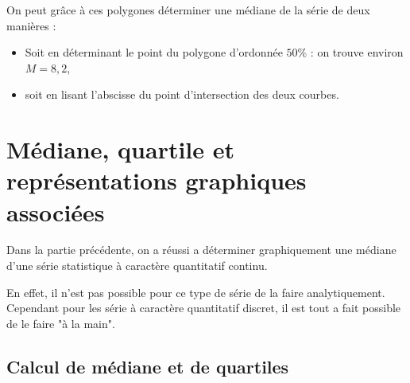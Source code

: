 \begin{ex}{}{}
\begin{center}
   \end{center}
   On peut grâce à ces polygones déterminer une médiane de la série de deux manières :
   \begin{itemize}
      \item  Soit en  déterminant le point du polygone d'ordonnée $50\%$ : on trouve environ $M =8,2$,
      \item  soit en lisant l'abscisse du point d'intersection des deux courbes.
   \end{itemize}
\end{ex}

\section{Médiane, quartile et représentations graphiques associées} \label{Eff_Med}

Dans la partie précédente, on a réussi a déterminer graphiquement une médiane d'une série statistique à caractère quantitatif continu.

En effet, il n'est pas possible pour ce type de série de la faire analytiquement. Cependant pour les série à caractère quantitatif discret, il est tout a fait possible de le faire "à la main".

\subsection{Calcul de médiane et de quartiles}

